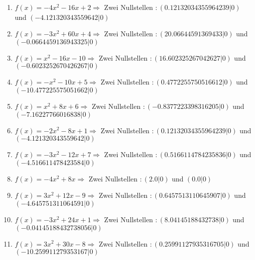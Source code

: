 \documentclass{article}%
\begin{document}
\begin{enumerate}[label=\alph*)]
\item%
\newline\vspace{0.5cm}$f(x)=-4x^2 - 16x + 2 \Rightarrow $ Zwei Nullstellen $: (0.12132034355964239|0) $ und $ (-4.121320343559642|0) $%
\item%
\newline\vspace{0.5cm}$f(x)=-3x^2 + 60x + 4 \Rightarrow $ Zwei Nullstellen $: (20.06644591369433|0) $ und $ (-0.0664459136943325|0) $%
\item%
\newline\vspace{0.5cm}$f(x)=x^2 - 16x - 10 \Rightarrow $ Zwei Nullstellen $: (16.602325267042627|0) $ und $ (-0.6023252670426267|0) $%
\item%
\newline\vspace{0.5cm}$f(x)=-x^2 - 10x + 5 \Rightarrow $ Zwei Nullstellen $: (0.4772255750516612|0) $ und $ (-10.477225575051662|0) $%
\item%
\newline\vspace{0.5cm}$f(x)=x^2 + 8x + 6 \Rightarrow $ Zwei Nullstellen $: (-0.8377223398316205|0) $ und $ (-7.16227766016838|0) $%
\item%
\newline\vspace{0.5cm}$f(x)=-2x^2 - 8x + 1 \Rightarrow $ Zwei Nullstellen $: (0.12132034355964239|0) $ und $ (-4.121320343559642|0) $%
\item%
\newline\vspace{0.5cm}$f(x)=-3x^2 - 12x + 7 \Rightarrow $ Zwei Nullstellen $: (0.5166114784235836|0) $ und $ (-4.516611478423584|0) $%
\item%
\newline\vspace{0.5cm}$f(x)=-4x^2 + 8x \Rightarrow $ Zwei Nullstellen $: (2.0|0) $ und $ (0.0|0) $%
\item%
\newline\vspace{0.5cm}$f(x)=3x^2 + 12x - 9 \Rightarrow $ Zwei Nullstellen $: (0.6457513110645907|0) $ und $ (-4.645751311064591|0) $%
\item%
\newline\vspace{0.5cm}$f(x)=-3x^2 + 24x + 1 \Rightarrow $ Zwei Nullstellen $: (8.04145188432738|0) $ und $ (-0.04145188432738056|0) $%
\item%
\newline\vspace{0.5cm}$f(x)=3x^2 + 30x - 8 \Rightarrow $ Zwei Nullstellen $: (0.25991127935316705|0) $ und $ (-10.259911279353167|0) $%
\end{enumerate}
\end{document}
